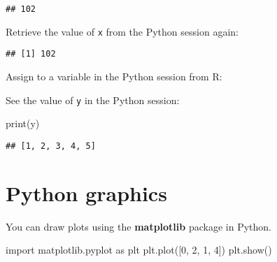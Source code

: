 \documentclass[]{book}
\newenvironment{Shaded}{\begin{snugshade}}{\end{snugshade}}
\newcommand{\BuiltInTok}[1]{#1}
\newcommand{\DecValTok}[1]{\textcolor[rgb]{0.00,0.00,0.81}{#1}}
\newcommand{\ImportTok}[1]{#1}
\newcommand{\NormalTok}[1]{#1}
\newcommand{\OperatorTok}[1]{\textcolor[rgb]{0.81,0.36,0.00}{\textbf{#1}}}
\newcommand{\StringTok}[1]{\textcolor[rgb]{0.31,0.60,0.02}{#1}}
\theoremstyle{definition}
\theoremstyle{definition}
\theoremstyle{definition}
\theoremstyle{remark}
\begin{document}
\begin{verbatim}
## 102
\end{verbatim}

Retrieve the value of \texttt{x} from the Python session again:

\begin{Shaded}
\end{Shaded}

\begin{verbatim}
## [1] 102
\end{verbatim}

Assign to a variable in the Python session from R:

\begin{Shaded}
\end{Shaded}

See the value of \texttt{y} in the Python session:

\begin{Shaded}
\begin{Highlighting}[]
\BuiltInTok{print}\NormalTok{(y)}
\end{Highlighting}
\end{Shaded}

\begin{verbatim}
## [1, 2, 3, 4, 5]
\end{verbatim}

\hypertarget{python-graphics}{%
\section{Python graphics}\label{python-graphics}}

You can draw plots using the \textbf{matplotlib} package in Python.

\begin{Shaded}
\begin{Highlighting}[]
\ImportTok{import}\NormalTok{ matplotlib.pyplot }\ImportTok{as}\NormalTok{ plt}
\NormalTok{plt.plot([}\DecValTok{0}\NormalTok{, }\DecValTok{2}\NormalTok{, }\DecValTok{1}\NormalTok{, }\DecValTok{4}\NormalTok{])}
\NormalTok{plt.show()}
\end{Highlighting}
\end{Shaded}
\end{document}
